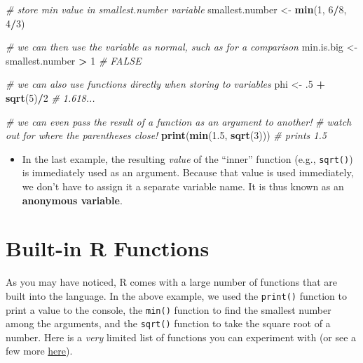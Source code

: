 \documentclass[]{book}
\newenvironment{Shaded}{\begin{snugshade}}{\end{snugshade}}
\newcommand{\KeywordTok}[1]{\textcolor[rgb]{0.13,0.29,0.53}{\textbf{#1}}}
\newcommand{\DecValTok}[1]{\textcolor[rgb]{0.00,0.00,0.81}{#1}}
\newcommand{\FloatTok}[1]{\textcolor[rgb]{0.00,0.00,0.81}{#1}}
\newcommand{\StringTok}[1]{\textcolor[rgb]{0.31,0.60,0.02}{#1}}
\newcommand{\CommentTok}[1]{\textcolor[rgb]{0.56,0.35,0.01}{\textit{#1}}}
\newcommand{\OperatorTok}[1]{\textcolor[rgb]{0.81,0.36,0.00}{\textbf{#1}}}
\newcommand{\NormalTok}[1]{#1}
\providecommand{\tightlist}{%
  \setlength{\itemsep}{0pt}\setlength{\parskip}{0pt}}
\theoremstyle{definition}
\theoremstyle{definition}
\theoremstyle{remark}
\begin{document}
\begin{Shaded}
\begin{Highlighting}[]
\CommentTok{# store min value in smallest.number variable}
\NormalTok{smallest.number <-}\StringTok{ }\KeywordTok{min}\NormalTok{(}\DecValTok{1}\NormalTok{, }\DecValTok{6}\OperatorTok{/}\DecValTok{8}\NormalTok{, }\DecValTok{4}\OperatorTok{/}\DecValTok{3}\NormalTok{)}

\CommentTok{# we can then use the variable as normal, such as for a comparison}
\NormalTok{min.is.big <-}\StringTok{ }\NormalTok{smallest.number }\OperatorTok{>}\StringTok{ }\DecValTok{1}  \CommentTok{# FALSE}

\CommentTok{# we can also use functions directly when storing to variables}
\NormalTok{phi <-}\StringTok{ }\NormalTok{.}\DecValTok{5} \OperatorTok{+}\StringTok{ }\KeywordTok{sqrt}\NormalTok{(}\DecValTok{5}\NormalTok{)}\OperatorTok{/}\DecValTok{2}  \CommentTok{# 1.618...}

\CommentTok{# we can even pass the result of a function as an argument to another!}
\CommentTok{# watch out for where the parentheses close!}
\KeywordTok{print}\NormalTok{(}\KeywordTok{min}\NormalTok{(}\FloatTok{1.5}\NormalTok{, }\KeywordTok{sqrt}\NormalTok{(}\DecValTok{3}\NormalTok{)))  }\CommentTok{# prints 1.5}
\end{Highlighting}
\end{Shaded}

\begin{itemize}
\tightlist
\item
  In the last example, the resulting \emph{value} of the ``inner''
  function (e.g., \texttt{sqrt()}) is immediately used as an argument.
  Because that value is used immediately, we don't have to assign it a
  separate variable name. It is thus known as an \textbf{anonymous
  variable}.
\end{itemize}

\section{Built-in R Functions}\label{built-in-r-functions}

As you may have noticed, R comes with a large number of functions that
are built into the language. In the above example, we used the
\texttt{print()} function to print a value to the console, the
\texttt{min()} function to find the smallest number among the arguments,
and the \texttt{sqrt()} function to take the square root of a number.
Here is a \emph{very} limited list of functions you can experiment with
(or see a few more
\href{http://www.statmethods.net/management/functions.html}{here}).
\end{document}
